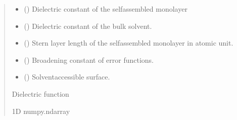 \documentclass[letterpaper,10pt,english]{sphinxmanual}
\begin{document}
\begin{fulllineitems}
\begin{fulllineitems}
\begin{quote}
\begin{description}
\begin{itemize}
\item {} 
\sphinxAtStartPar
{} () \textendash{} Dielectric constant of the self\sphinxhyphen{}assembled monolayer

\item {} 
\sphinxAtStartPar
{} () \textendash{} Dielectric constant of the bulk solvent.

\item {} 
\sphinxAtStartPar
{} () \textendash{} Stern layer length of the self\sphinxhyphen{}assembled monolayer in atomic unit.

\item {} 
\sphinxAtStartPar
{} () \textendash{} Broadening constant of error functions.

\item {} 
\sphinxAtStartPar
{} () \textendash{} Solvent\sphinxhyphen{}accessible surface.

\end{itemize}

\sphinxAtStartPar
Dielectric function

\sphinxAtStartPar
1D numpy.ndarray

\end{description}\end{quote}

\end{fulllineitems}



\end{fulllineitems}
\end{document}
